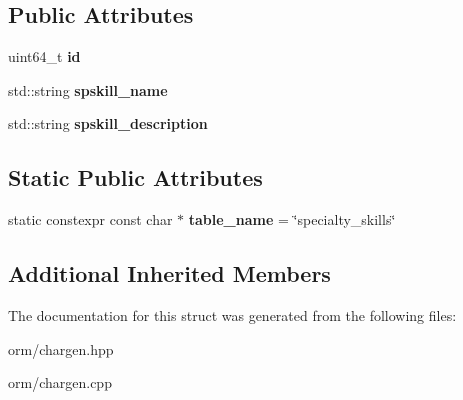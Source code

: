\subsection*{Public Attributes}
\begin{DoxyCompactItemize}
\item 
\mbox{\label{structmods_1_1orm_1_1specialty__skills_af8eacb31ba59bf0e259dab46cce5992d}} 
uint64\+\_\+t {\bfseries id}
\item 
\mbox{\label{structmods_1_1orm_1_1specialty__skills_a8256ef3be969761db79c7e1a2be3a355}} 
std\+::string {\bfseries spskill\+\_\+name}
\item 
\mbox{\label{structmods_1_1orm_1_1specialty__skills_a44221297084c958de5eafea4508e4af5}} 
std\+::string {\bfseries spskill\+\_\+description}
\end{DoxyCompactItemize}
\subsection*{Static Public Attributes}
\begin{DoxyCompactItemize}
\item 
\mbox{\label{structmods_1_1orm_1_1specialty__skills_aaf6fe95703728bee69bf26ffe604cca4}} 
static constexpr const char $\ast$ {\bfseries table\+\_\+name} = \char`\"{}specialty\+\_\+skills\char`\"{}
\end{DoxyCompactItemize}
\subsection*{Additional Inherited Members}


The documentation for this struct was generated from the following files\+:\begin{DoxyCompactItemize}
\item 
orm/chargen.\+hpp\item 
orm/chargen.\+cpp\end{DoxyCompactItemize}

